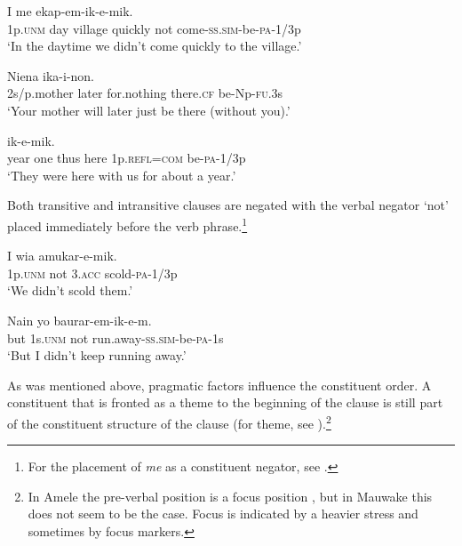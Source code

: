 \ea%
\label{ex:x915}
\gll I      me  ekap-em-ik-e-mik. \\
     1p.\textsc{unm}  day  village  quickly  not  come-\textsc{ss}.\textsc{sim}-be-\textsc{pa}-1/3p \\
\glt `In the daytime we didn't come quickly to the village.'
\z

\ea%
\label{ex:x918}
\gll Niena      ika-i-non. \\
     2s/p.mother  later  for.nothing  there.\textsc{cf}  be-Np-\textsc{fu}.3s \\
\glt `Your mother will later just be there (without you).'
\z

\ea%
\label{ex:x919}
\gll {}        ik-e-mik. \\
     year  one  thus  here  1p.\textsc{refl}=\textsc{com}  be-\textsc{pa}-1/3p \\
\glt `They were here with us for about a year.' 
\z

Both transitive and intransitive clauses are negated with the verbal negator  `not' placed immediately before the verb phrase.\footnote{For the placement of \textit{me} as a constituent negator, see .} 

\ea%
\label{ex:x981}
\gll I    wia  amukar-e-mik. \\
     1p.\textsc{unm}  not  3.\textsc{acc}  scold-\textsc{pa}-1/3p \\
\glt `We didn't scold them.'
\z

\ea%
\label{ex:x1057}
\gll Nain  yo    baurar-em-ik-e-m. \\
     but  1s.\textsc{unm}  not  run.away-\textsc{ss}.\textsc{sim}-be-\textsc{pa}-1s \\
\glt `But I didn't keep running away.'
\z

As was mentioned above, pragmatic factors influence the constituent order.  A constituent that is fronted as a theme to the beginning of the clause is still part of the constituent structure of the clause (for theme, see ).\footnote{In Amele the pre-verbal position is a focus position \citep[142]{Roberts1987}, but in Mauwake this does not seem to be the case. Focus is indicated by a heavier stress and sometimes by focus markers.} 

